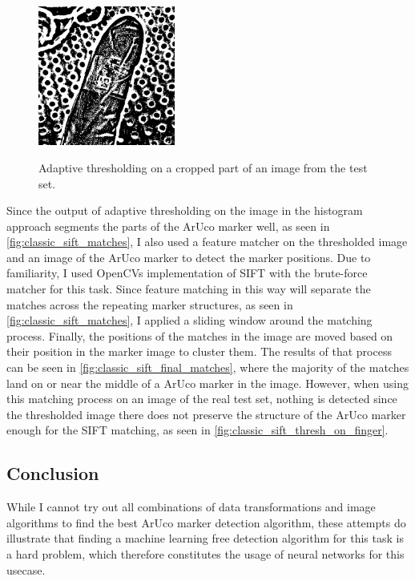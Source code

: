 \documentclass[10pt]{book}
\newcommand{\figureref}[1]{\autoref{#1}}
\begin{document}
\begin{figure}
  \caption{Adaptive thresholding on a cropped part of an image from the test set.}
  \includegraphics[width=0.4\textwidth]{image/classic_sift_thresh_on_finger}
  \label{fig:classic_sift_thresh_on_finger}
\end{figure}

Since the output of adaptive thresholding on the image in the histogram approach segments the parts of the \ac{ArUco} marker well, as seen in \figureref{fig:classic_sift_matches}, I also used a feature matcher on the thresholded image and an image of the \ac{ArUco} marker to detect the marker positions. Due to familiarity, I used \acp{OpenCV} implementation of \ac{SIFT} with the brute-force matcher for this task. Since feature matching in this way will separate the matches across the repeating marker structures, as seen in \figureref{fig:classic_sift_matches}, I applied a sliding window around the matching process. Finally, the positions of the matches in the image are moved based on their position in the marker image to cluster them. %
The results of that process can be seen in \figureref{fig:classic_sift_final_matches}, where the majority of the matches land on or near the middle of a \ac{ArUco} marker in the image. However, when using this matching process on an image of the real test set, nothing is detected since the thresholded image there does not preserve the structure of the \ac{ArUco} marker enough for the \ac{SIFT} matching, as seen in \figureref{fig:classic_sift_thresh_on_finger}.

\subsection{Conclusion}

While I cannot try out all combinations of data transformations and image algorithms to find the best \ac{ArUco} marker detection algorithm, these attempts do illustrate that finding a machine learning free detection algorithm for this task is a hard problem, which therefore constitutes the usage of neural networks for this usecase.
\end{document}
